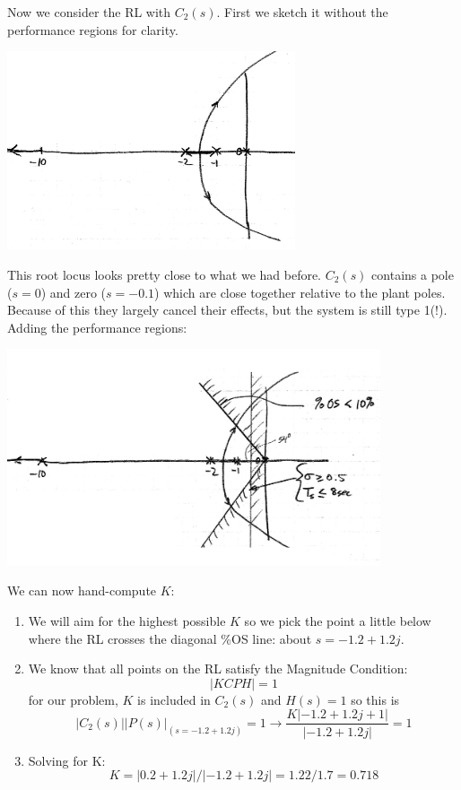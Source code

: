 \begin{ExampleCont}
Now we consider the RL with $C_2(s)$.   First we sketch it without
the performance regions for clarity.

\includegraphics[width=85mm]{figs09/01109.png}

This root locus looks pretty close to what we had before.
 $C_2(s)$ contains a pole ($s=0$) and zero ($s=-0.1$) which are close together relative to the plant poles.  Because
 of this they largely cancel their effects, but the system is still type 1(!).  Adding the performance regions:

 \includegraphics[width=110mm]{figs09/01110.png}

 We can now hand-compute $K$:

 \begin{enumerate}
   \item We will aim for the highest possible $K$ so we pick the point a little below where the RL crosses the diagonal \%OS line:
   about $s = -1.2+1.2j$.
   \item We know that all points on the RL satisfy the Magnitude Condition:
   \[
   |KCPH| = 1
   \]
   for our problem, $K$ is included in $C_2(s)$ and $H(s) =1$  so this is
   \[
   |C_2(s)||P(s)|_{(s=-1.2+1.2j)} = 1 \to  \frac   {K|-1.2+1.2j+1|} {|-1.2+1.2j|} = 1
   \]
   \item Solving for K:
   \[
   K = |0.2+1.2j|/|-1.2+1.2j| = 1.22/1.7 = 0.718
   \]

 \end{enumerate}
\end{ExampleCont}

